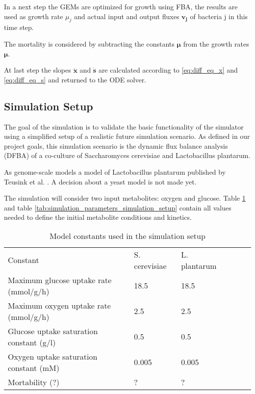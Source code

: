 In a next step the GEMs are optimized for growth using FBA, the results are used as growth rate $\mu_j$ and actual input and output
fluxes $\bm{v_j}$ of bacteria j in this time step.

The mortality is considered by subtracting the constants $\bm{\mu}$ from the growth rates $\bm{\mu}$.

At last step the slopes $\dot{\bm{x}}$ and $\bm{\dot{s}}$ are calculated according to \ref{eq:diff_eq_x} and \ref{eq:diff_eq_s} and
returned to the ODE solver.


\subsection{Simulation Setup}\label{ssec:simulation_setup}

The goal of the simulation is to validate the basic functionality of the simulator using a simplified setup of a realistic future
simulation scenario. As defined in our project goals, this simulation scenario is the dynamic flux balance analysis (DFBA) of a
co-culture of Saccharomyces cerevisiae and Lactobacillus plantarum.

As genome-scale models a model of Lactobacillus plantarum published by Teusink et al. \cite{teusink_analysis_2006}. A decision about
a yeast model is not made yet.

The simulation will consider two input metabolites: oxygen and glucose. Table \ref{tab:model_constants_simulation_setup} and table
\ref{tab:simulation_parameters_simulation_setup} contain all values needed to define the initial metabolite conditions and kinetics.

\begin{table}[h]
\centering
\caption{Model constants used in the simulation setup}
\label{tab:model_constants_simulation_setup}
\begin{tabular}{llllll}
\rowcolor[HTML]{EFEFEF} 
\cellcolor[HTML]{EFEFEF} Constant          & \cellcolor[HTML]{EFEFEF}S. cerevisiae & \cellcolor[HTML]{EFEFEF}L. plantarum\\
Maximum glucose uptake rate (mmol/g/h)     & 18.5 & 18.5 \\
Maximum oxygen uptake rate (mmol/g/h)      & 2.5 & 2.5 \\
Glucose uptake saturation constant (g/l)   & 0.5 & 0.5 \\
Oxygen uptake saturation constant (mM)     & 0.005 & 0.005 \\
Mortability (?)                            & ? & ? \\
\end{tabular}
\end{table}

